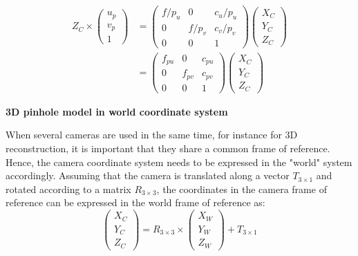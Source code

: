 \begin{equation}
  \begin{split}
  Z_C \times \begin{pmatrix}u_p\\v_p\\1\end{pmatrix} 
  &= \begin{pmatrix}f/p_u & 0 &c_u/p_u \\0 & f/p_v & c_v/p_v\\0&0&1\end{pmatrix}\begin{pmatrix}X_C\\Y_C\\Z_C\end{pmatrix}\\
  &= \begin{pmatrix}f_{pu} & 0 & c_{pu} \\0 & f_{pv} & c_{pv} \\ 0&0&1\end{pmatrix}\begin{pmatrix}X_C\\Y_C\\Z_C\end{pmatrix}
  \end{split}
\end{equation}


\vspace*{0.5cm}
\noindent\textbf{3D pinhole model in world coordinate system}

When several cameras are used in the same time, for instance for 3D reconstruction, it is important that they share a common frame of reference. Hence, the camera coordinate system needs to be expressed in the "world" system accordingly. Assuming that the camera is translated along a vector $T_{3\times 1}$ and rotated according to a matrix $R_{3\times 3}$, the coordinates in the camera frame of reference can be expressed in the world frame of reference as:
\begin{equation}
  \begin{pmatrix}X_C\\Y_C\\Z_C\end{pmatrix}
  = R_{3\times 3} \times \begin{pmatrix}X_W\\Y_W\\Z_W\end{pmatrix} + T_{3\times 1}
\end{equation}

